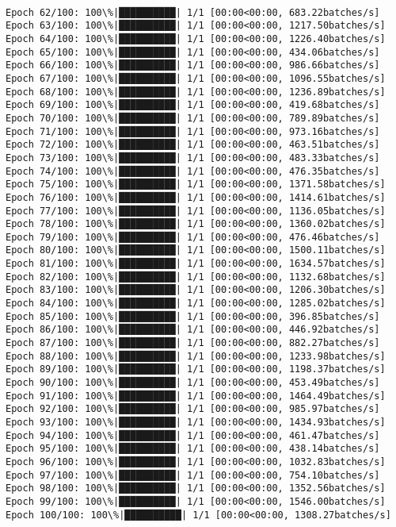 \documentclass[11pt]{article}
\begin{document}
    \begin{Verbatim}[commandchars=\\\{\}]

Epoch 62/100: 100\%|██████████| 1/1 [00:00<00:00, 683.22batches/s]
Epoch 63/100: 100\%|██████████| 1/1 [00:00<00:00, 1217.50batches/s]
Epoch 64/100: 100\%|██████████| 1/1 [00:00<00:00, 1226.40batches/s]
Epoch 65/100: 100\%|██████████| 1/1 [00:00<00:00, 434.06batches/s]
Epoch 66/100: 100\%|██████████| 1/1 [00:00<00:00, 986.66batches/s]
Epoch 67/100: 100\%|██████████| 1/1 [00:00<00:00, 1096.55batches/s]
Epoch 68/100: 100\%|██████████| 1/1 [00:00<00:00, 1236.89batches/s]
Epoch 69/100: 100\%|██████████| 1/1 [00:00<00:00, 419.68batches/s]
Epoch 70/100: 100\%|██████████| 1/1 [00:00<00:00, 789.89batches/s]
Epoch 71/100: 100\%|██████████| 1/1 [00:00<00:00, 973.16batches/s]
Epoch 72/100: 100\%|██████████| 1/1 [00:00<00:00, 463.51batches/s]
Epoch 73/100: 100\%|██████████| 1/1 [00:00<00:00, 483.33batches/s]
Epoch 74/100: 100\%|██████████| 1/1 [00:00<00:00, 476.35batches/s]
Epoch 75/100: 100\%|██████████| 1/1 [00:00<00:00, 1371.58batches/s]
Epoch 76/100: 100\%|██████████| 1/1 [00:00<00:00, 1414.61batches/s]
Epoch 77/100: 100\%|██████████| 1/1 [00:00<00:00, 1136.05batches/s]
Epoch 78/100: 100\%|██████████| 1/1 [00:00<00:00, 1360.02batches/s]
Epoch 79/100: 100\%|██████████| 1/1 [00:00<00:00, 476.46batches/s]
Epoch 80/100: 100\%|██████████| 1/1 [00:00<00:00, 1500.11batches/s]
Epoch 81/100: 100\%|██████████| 1/1 [00:00<00:00, 1634.57batches/s]
Epoch 82/100: 100\%|██████████| 1/1 [00:00<00:00, 1132.68batches/s]
Epoch 83/100: 100\%|██████████| 1/1 [00:00<00:00, 1206.30batches/s]
Epoch 84/100: 100\%|██████████| 1/1 [00:00<00:00, 1285.02batches/s]
Epoch 85/100: 100\%|██████████| 1/1 [00:00<00:00, 396.85batches/s]
Epoch 86/100: 100\%|██████████| 1/1 [00:00<00:00, 446.92batches/s]
Epoch 87/100: 100\%|██████████| 1/1 [00:00<00:00, 882.27batches/s]
Epoch 88/100: 100\%|██████████| 1/1 [00:00<00:00, 1233.98batches/s]
Epoch 89/100: 100\%|██████████| 1/1 [00:00<00:00, 1198.37batches/s]
Epoch 90/100: 100\%|██████████| 1/1 [00:00<00:00, 453.49batches/s]
Epoch 91/100: 100\%|██████████| 1/1 [00:00<00:00, 1464.49batches/s]
Epoch 92/100: 100\%|██████████| 1/1 [00:00<00:00, 985.97batches/s]
Epoch 93/100: 100\%|██████████| 1/1 [00:00<00:00, 1434.93batches/s]
Epoch 94/100: 100\%|██████████| 1/1 [00:00<00:00, 461.47batches/s]
Epoch 95/100: 100\%|██████████| 1/1 [00:00<00:00, 438.14batches/s]
Epoch 96/100: 100\%|██████████| 1/1 [00:00<00:00, 1032.83batches/s]
Epoch 97/100: 100\%|██████████| 1/1 [00:00<00:00, 754.10batches/s]
Epoch 98/100: 100\%|██████████| 1/1 [00:00<00:00, 1352.56batches/s]
Epoch 99/100: 100\%|██████████| 1/1 [00:00<00:00, 1546.00batches/s]
Epoch 100/100: 100\%|██████████| 1/1 [00:00<00:00, 1308.27batches/s]

    \end{Verbatim}
\end{document}
